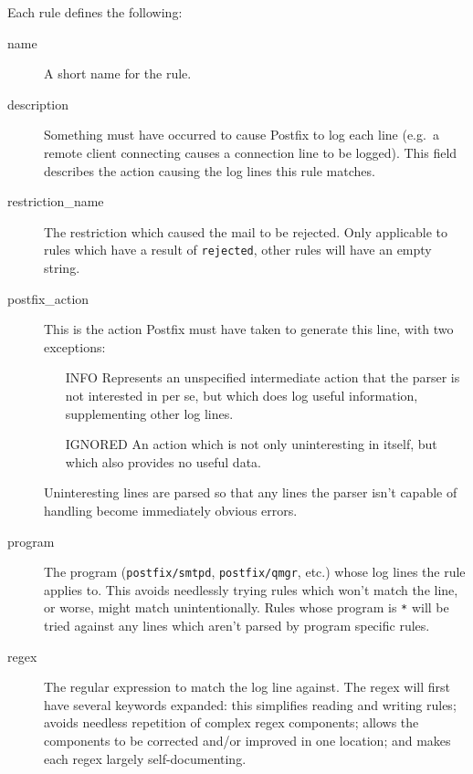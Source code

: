\documentclass[a4paper,12pt,draft]{article}
\begin{document}
Each rule defines the following:

\begin{description}

    \item [name] A short name for the rule.

    \item [description] Something must have occurred to cause Postfix to
        log each line (e.g.\ a remote client connecting causes a connection
        line to be logged).  This field describes the action causing the
        log lines this rule matches.

    \item [restriction\_name] The restriction which caused the mail to be
        rejected.  Only applicable to rules which have a result of
        \texttt{rejected}, other rules will have an empty string.

    \item [postfix\_action] This is the action Postfix must have taken to
        generate this line, with two exceptions:

        \begin{itemize}

            \item [INFO] Represents an unspecified intermediate action that
                the parser is not interested in per se, but which does log
                useful information, supplementing other log lines.

            \item [IGNORED] An action which is not only uninteresting in
                itself, but which also provides no useful data.

        \end{itemize}

        Uninteresting lines are parsed so that any lines the parser isn't
        capable of handling become immediately obvious errors.

    \item [program] The program (\texttt{postfix/smtpd},
        \texttt{postfix/qmgr}, etc.) whose log lines the rule applies to.
        This avoids needlessly trying rules which won't match the line, or
        worse, might match unintentionally.  Rules whose program is
        \texttt{*} will be tried against any lines which aren't parsed by
        program specific rules.

    \item [regex] The regular expression\cite{wikipedia-regex, perlre} to
        match the log line against.  The regex will first have several
        keywords expanded: this simplifies reading and writing rules;
        avoids needless repetition of complex regex components; allows the
        components to be corrected and/or improved in one location; and
        makes each regex largely self-documenting.
        

\end{description}
\end{document}
